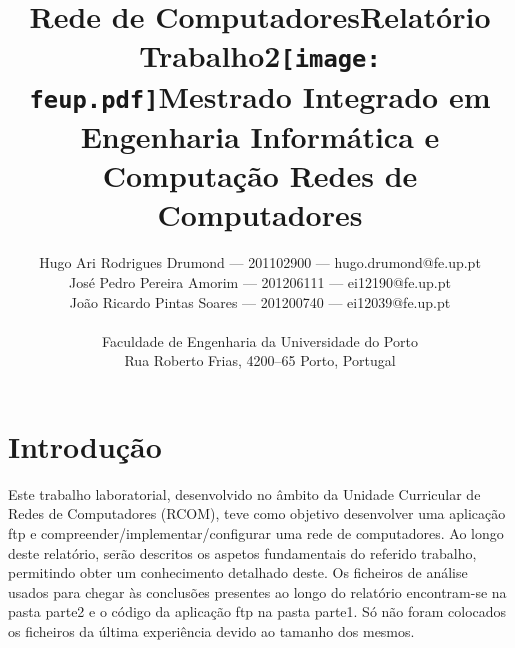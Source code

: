 \documentclass[a4paper]{article}
\begin{document}
\setlength{\textwidth}{16cm} \setlength{\textheight}{22cm}

\title{\Huge\textbf{Rede de Computadores}\linebreak\linebreak\linebreak\linebreak \Large\textbf{Relatório \\
    Trabalho2}\linebreak\linebreak\linebreak\texttt{[image: feup.pdf]}\linebreak \linebreak \Large{Mestrado Integrado em
    Engenharia Informática e Computação} \linebreak \linebreak \Large\textbf{Redes de
Computadores}\linebreak}

\author{Hugo Ari Rodrigues Drumond --- 201102900 --- hugo.drumond@fe.up.pt \\
    José Pedro Pereira Amorim --- 201206111 --- ei12190@fe.up.pt \\ João
    Ricardo Pintas Soares --- 201200740 ---
    ei12039@fe.up.pt\linebreak\linebreak\linebreak \\ \\ Faculdade de
    Engenharia da Universidade do Porto \\ Rua Roberto Frias, 4200--65 Porto,
    Portugal \linebreak\linebreak\linebreak \linebreak\linebreak\vspace{1cm}}
    \maketitle \thispagestyle{empty}

\newpage

\section{Introdução}
Este trabalho laboratorial, desenvolvido no âmbito da Unidade Curricular de
Redes de Computadores (RCOM), teve como objetivo desenvolver uma aplicação ftp
e compreender/implementar/configurar uma rede de computadores. Ao longo deste
relatório, serão descritos os aspetos fundamentais do referido trabalho,
permitindo obter um conhecimento detalhado deste. Os ficheiros de análise
usados para chegar às conclusões presentes ao longo do relatório encontram-se
na pasta parte2 e o código da aplicação ftp na pasta parte1. Só não foram
colocados os ficheiros da última experiência devido ao tamanho dos mesmos.
\end{document}
